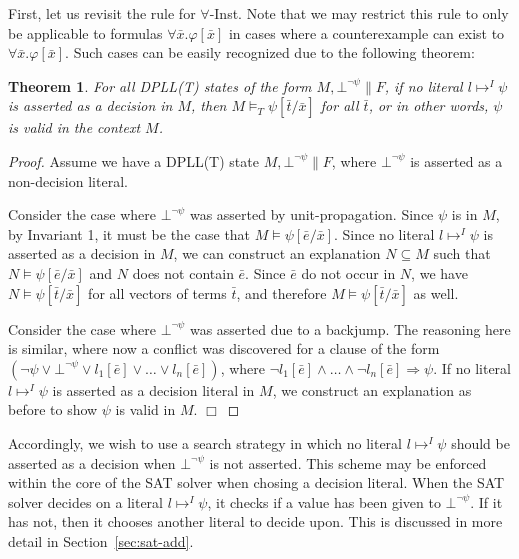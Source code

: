 \documentclass{llncs}
\newtheorem{thm}{Theorem}
\begin{document}
First, let us revisit the rule for $\forall$-Inst.
Note that we may restrict this rule to only be applicable to formulas $\forall \bar{x}. \varphi[ \bar{ x } ]$ in cases where a counterexample can exist to $\forall \bar{x}. \varphi[ \bar{ x } ]$.
Such cases can be easily recognized due to the following theorem:

\begin{thm}
For all DPLL(T) states of the form $M, \bot^{\neg \psi} \parallel F$, if no literal $l \mapsto^I \psi$ is asserted as a decision in $M$, then $M \models_T \psi[\bar{t}/\bar{x}]$ for all $\bar{t}$, or in other words, $\psi$ is valid in the context $M$.
\end{thm}
\begin{proof}
Assume we have a DPLL(T) state $M, \bot^{\neg \psi} \parallel F$, where $\bot^{\neg \psi}$ is asserted as a non-decision literal.

Consider the case where $\bot^{\neg \psi}$ was asserted by unit-propagation.
Since $\psi$ is in $M$, by Invariant 1, it must be the case that $M \models \psi[\bar{e}/\bar{x}]$.
Since no literal $l \mapsto^I \psi$ is asserted as a decision in $M$, we can construct an explanation $N \subseteq M$ such that $N \models \psi[\bar{e}/\bar{x}]$ and $N$ does not contain $\bar{e}$.
Since $\bar{e}$ do not occur in $N$, we have $N \models \psi[\bar{t}/\bar{x}]$ for all vectors of terms $\bar{t}$, and therefore $M \models \psi[\bar{t}/\bar{x}]$ as well.

Consider the case where $\bot^{\neg \psi}$ was asserted due to a backjump.
The reasoning here is similar, where now a conflict was discovered for a clause of the form $( \neg \psi \vee \bot^{\neg \psi} \vee l_1[\bar{e}] \vee \ldots \vee l_n[\bar{e}])$, where $\neg l_1[\bar{e}] \wedge \ldots \wedge \neg l_n[\bar{e}] \Rightarrow \psi$.
If no literal $l \mapsto^I \psi$ is asserted as a decision literal in $M$, we construct an explanation as before to show $\psi$ is valid in $M$.
$\Box$
\end{proof}

Accordingly, we wish to use a search strategy in which no literal $l \mapsto^I \psi$ should be asserted as a decision when $\bot^{\neg \psi}$ is not asserted.
This scheme may be enforced within the core of the SAT solver when chosing a decision literal.
When the SAT solver decides on a literal $l \mapsto^I \psi$, it checks if a value has been given to $\bot^{\neg \psi}$.
If it has not, then it chooses another literal to decide upon.
This is discussed in more detail in Section~\ref{sec:sat-add}.
\end{document}

